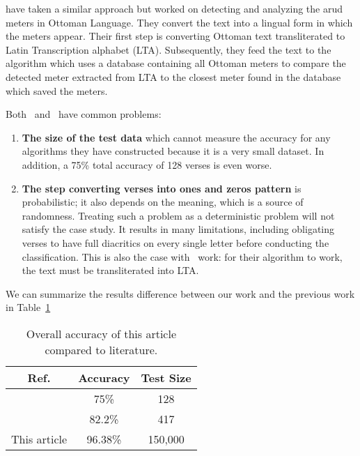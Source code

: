 \cite{Kurt2012AlgorithmForDetectionAnalysis} have taken a similar approach but worked on detecting and analyzing the arud meters in Ottoman Language. They convert the text into a lingual form in which the meters appear. Their first step is converting Ottoman text transliterated to Latin Transcription alphabet (LTA). Subsequently, they feed the text to the algorithm which uses a database containing all Ottoman meters to compare the detected meter extracted from LTA to the closest meter found in the database which saved the meters.

Both~\cite{Abuata2016RuleBasedAlgorithm} and~\cite{Alnagdawi2013FindingArabicPoemMeter} have common problems:

\begin{enumerate}
\item \textbf{The size of the test data} which cannot measure the accuracy for any algorithms they have constructed because it is a very small dataset. In addition, a 75\% total accuracy of 128 verses is even worse.
\item \textbf{The step converting verses into ones and zeros pattern} is probabilistic; it also depends on the meaning, which is a source of randomness. Treating such a problem as a deterministic problem will not satisfy the case study. It results in many limitations, including obligating verses to have full diacritics on every single letter before conducting the classification. This is also the case with~\cite{Kurt2012AlgorithmForDetectionAnalysis} work: for their algorithm to work, the text must be transliterated into LTA.
\end{enumerate}

We can summarize the results difference between our work and the previous work in Table~\ref{Tab:Summary_Results}

\begin{table}[h]
\centering
\begin{tabular}{c c c}
\toprule
\textbf{Ref.}& \textbf{Accuracy}& \textbf{Test Size} \\
\midrule
\cite{Alnagdawi2013FindingArabicPoemMeter} & 75\% & 128\\
\cite{Abuata2016RuleBasedAlgorithm}& 82.2\% & 417\\
This article & 96.38\%& 150,000 \\
\bottomrule
\end{tabular}
\caption{Overall accuracy of this article compared to literature.}\label{Tab:Summary_Results}
\end{table}


